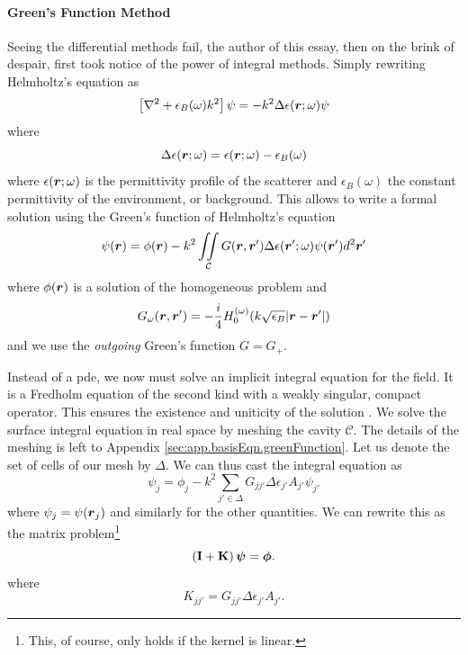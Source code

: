 \paragraph{Green's Function Method}
Seeing the differential methods fail, the author of this essay, 
then on the brink of despair, first took notice of the 
power of integral methods. Simply rewriting Helmholtz's 
equation as
  \begin{equation}
   \left[\nabla^2+\epsilon_B(\omega)k^2\right]\psi=-k^2\Delta\epsilon(\boldsymbol{r};\omega)\psi
  \end{equation}
where 
  \begin{equation}
  \Delta\epsilon(\boldsymbol{r};\omega)=\epsilon(\boldsymbol{r};\omega)-\epsilon_B(\omega)
  \end{equation}
where $\epsilon(\boldsymbol{r};\omega)$ is the permittivity profile of the scatterer
and $\epsilon_B(\omega)$ the constant permittivity of the environment, or background.
This allows to write a formal solution using the Green's function of Helmholtz's equation
  \begin{equation}
   \psi(\boldsymbol{r}) = \phi(\boldsymbol{r}) - k^2\mathop{\iint}_\mathcal{C}G(\boldsymbol{r},\boldsymbol{r}')\Delta\epsilon(\boldsymbol{r}';\omega)\psi(\boldsymbol{r}')d^2\boldsymbol{r}'
  \end{equation}
where $\phi(\boldsymbol{r})$ is a solution of the homogeneous problem and
  \begin{equation}
   G_\omega(\boldsymbol{r},\boldsymbol{r}') = -\frac{i}{4}H_0^{(\omega)}(k\sqrt{\epsilon_B}|\boldsymbol{r}-\boldsymbol{r}'|)
  \end{equation}
and we use the \textit{outgoing} Green's function $G=G_+$.

Instead of a \gls{pde}, we now must solve an implicit 
integral equation for the field. It is a Fredholm 
equation of the second kind with a weakly singular, compact
operator. This ensures the existence
and uniticity of the solution \cite{GOH1981,COL2013}.
We solve the surface integral equation in real space by meshing
the cavity $\mathcal{C}$. The details of the meshing is left to 
Appendix \ref{sec:app.basisEqn.greenFunction}. Let us denote the set
of cells of our mesh by $\Delta$. We can thus cast the integral
equation as
	\begin{equation}
		\psi_j = \phi_j -k^2\sum_{j'\in\Delta} G_{jj'}\Delta\epsilon_{j'}A_{j'}\psi_{j'}
	\end{equation}
where $\psi_j=\psi(\boldsymbol{r}_j)$ and similarly for the other quantities. We can
rewrite this as the matrix problem\footnote{This, of course, only holds if the
kernel is linear.} 
	\begin{equation}
		\left(\mathbf{I}+\mathbf{K}\right)\boldsymbol{\psi}=\boldsymbol{\phi}.
	\end{equation}
where 
	\begin{equation}
		K_{jj'} = G_{jj'}\Delta\epsilon_{j'}A_{j'}.
	\end{equation}

